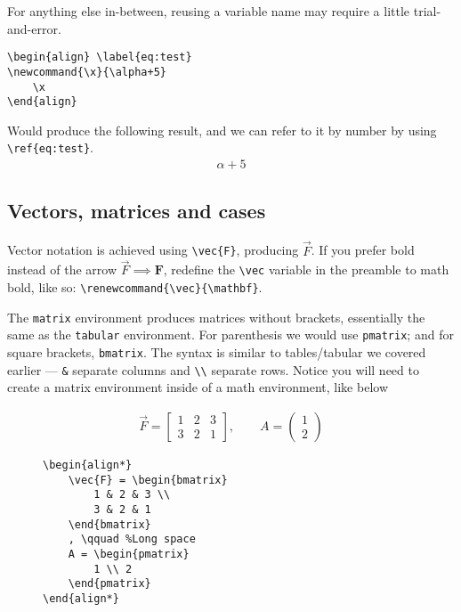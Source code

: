 For anything else in-between, reusing a variable name may require a little trial-and-error.

\begin{lstlisting}
\begin{align} \label{eq:test}
\newcommand{\x}{\alpha+5}
    \x
\end{align}
\end{lstlisting}
Would produce the following result, and we can refer to it by number by using \verb|\ref{eq:test}|.
\begin{align}
    \alpha+5
\end{align}
\subsection{Vectors, matrices and cases}
Vector notation is achieved using \verb|\vec{F}|, producing \(\vec{F}\).
If you prefer bold instead of the arrow \( \vec{F} \implies \mathbf{F}\), redefine the \verb|\vec| variable in the preamble to math bold, like so:
\verb|\renewcommand{\vec}{\mathbf}|.

The \verb|matrix| environment produces matrices without brackets, essentially the same as the \texttt{tabular} environment.
For parenthesis we would use \texttt{pmatrix}; and for square brackets, \texttt{bmatrix}.
The syntax is similar to tables/tabular we covered earlier --- \verb|&| separate columns and \verb|\\| separate rows.
Notice you will need to create a matrix environment inside of a math environment, like below 
\begin{figure}[h] \centering
\begin{minipage}{0.45\textwidth}
    \begin{align*}
        \vec{F} = \begin{bmatrix}
            1 & 2 & 3 \\
            3 & 2 & 1 
        \end{bmatrix}
        , \qquad
        A = \begin{pmatrix}
            1 \\ 2
    \end{pmatrix}
    \end{align*}
\end{minipage}
\hfill
\begin{minipage}{0.45\textwidth}
\begin{lstlisting}
\begin{align*}
    \vec{F} = \begin{bmatrix}
        1 & 2 & 3 \\
        3 & 2 & 1 
    \end{bmatrix}
    , \qquad %Long space
    A = \begin{pmatrix}
        1 \\ 2
    \end{pmatrix} 
\end{align*}
\end{lstlisting}
\end{minipage}

\end{figure}



